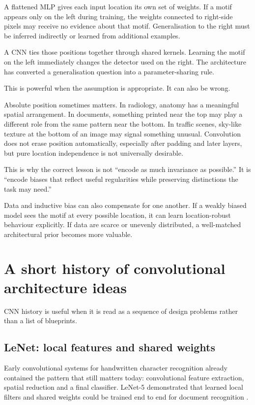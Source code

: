 A flattened MLP gives each input location its own set of weights. If a motif appears only on the left during training, the weights connected to right-side pixels may receive no evidence about that motif. Generalisation to the right must be inferred indirectly or learned from additional examples.

A CNN ties those positions together through shared kernels. Learning the motif on the left immediately changes the detector used on the right. The architecture has converted a generalisation question into a parameter-sharing rule.

This is powerful when the assumption is appropriate. It can also be wrong.

Absolute position sometimes matters. In radiology, anatomy has a meaningful spatial arrangement. In documents, something printed near the top may play a different role from the same pattern near the bottom. In traffic scenes, sky-like texture at the bottom of an image may signal something unusual. Convolution does not erase position automatically, especially after padding and later layers, but pure location independence is not universally desirable.

This is why the correct lesson is not ``encode as much invariance as possible.'' It is ``encode biases that reflect useful regularities while preserving distinctions the task may need.''

Data and inductive bias can also compensate for one another. If a weakly biased model sees the motif at every possible location, it can learn location-robust behaviour explicitly. If data are scarce or unevenly distributed, a well-matched architectural prior becomes more valuable.

\section{A short history of convolutional architecture ideas}

CNN history is useful when it is read as a sequence of design problems rather than a list of blueprints.

\subsection{LeNet: local features and shared weights}

Early convolutional systems for handwritten character recognition already contained the pattern that still matters today: convolutional feature extraction, spatial reduction and a final classifier. LeNet-5 demonstrated that learned local filters and shared weights could be trained end to end for document recognition \parencite{lecun1998}.

